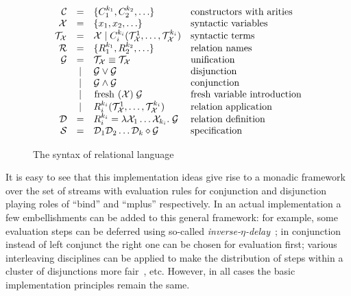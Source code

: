 \begin{figure}[t]
\[
  \begin{array}{rcll}
     \mathcal{C} & = & \{ C_1^{k_1}, C_2^{k_2}, \ldots \} 
     & \mbox{constructors with arities} 
     \\
     \mathcal{X} & = & \{x_1, x_2, \ldots \} 
     & \mbox{syntactic variables} 
     \\
     \mathcal{T}_\mathcal{X} & = & \mathcal{X} \mid C_i^{k_i}(\mathcal{T}_\mathcal{X}^1, \ldots, \mathcal{T}_\mathcal{X}^{k_i})
     & \mbox{syntactic terms} 
     \\
     \mathcal{R} & = & \{R_1^{k_1}, R_2^{k_2}, \ldots \} 
     & \mbox{relation names} 
     \\
     \mathcal{G} & =    & \mathcal{T}_\mathcal{X} \equiv \mathcal{T}_\mathcal{X} & \mbox{unification} \\
                 & \mid & \mathcal{G} \lor \mathcal{G} & \mbox{disjunction} \\
                 & \mid & \mathcal{G} \land \mathcal{G} & \mbox{conjunction} \\
                 & \mid & \mbox{\lstinline|fresh|} \; (\mathcal{X}) \; \mathcal{G} & \mbox{fresh variable introduction} \\
                 & \mid & R_i^{k_i}(\mathcal{T}_\mathcal{X}^1, \ldots, \mathcal{T}_\mathcal{X}^{k_i}) & \mbox{relation application} \\
    \mathcal{D} & = &R_i^{k_i} = \lambda \mathcal{X}_1 \ldots \mathcal{X}_{k_i}. \; \mathcal{G} & \mbox{relation definition}\\
    \mathcal{S} & = &\mathcal{D}_1\mathcal{D}_2\dots\mathcal{D}_k \diamond \mathcal{G} & \mbox{specification}
  \end{array}
\]
    \caption{The syntax of relational language}
    \label{syntax}
\end{figure}


It is easy to see that this implementation ideas give rise to a monadic framework over the set of streams with evaluation rules for conjunction and disjunction playing roles of ``bind'' and
``mplus'' respectively. In an actual implementation a few embellishments can be added to this general framework: for example, some evaluation steps can be deferred using so-called
\emph{inverse-$\eta$-delay}~\cite{MicroKanren}; in conjunction instead of left conjunct the right one can be chosen for evaluation first; various interleaving disciplines can
be applied to make the distribution of steps within a cluster of disjunctions more fair~\cite{fair:towardsAM}, etc. However, in all cases the basic implementation principles remain
the same.

